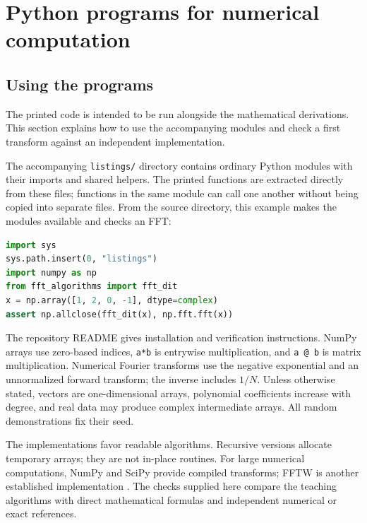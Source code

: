 \chapter{Python programs for numerical computation}
\label{appendix-python-numerical}

\section*{Using the programs}

The printed code is intended to be run alongside the mathematical
derivations. This section explains how to use the accompanying modules and
check a first transform against an independent implementation.

The accompanying \texttt{listings/} directory contains ordinary Python
modules with their imports and shared helpers. The printed functions are
extracted directly from these files; functions in the same module can call
one another without being copied into separate files. From the source
directory, this example makes the modules available and checks an FFT:
\begin{lstlisting}[language=Python]
import sys
sys.path.insert(0, "listings")
import numpy as np
from fft_algorithms import fft_dit
x = np.array([1, 2, 0, -1], dtype=complex)
assert np.allclose(fft_dit(x), np.fft.fft(x))
\end{lstlisting}
The repository README gives installation and verification instructions.
NumPy arrays use zero-based indices, \texttt{a*b} is entrywise multiplication,
and \texttt{a @ b} is matrix multiplication. Numerical Fourier transforms
use the negative exponential and an unnormalized forward transform; the
inverse includes $1/N$. Unless otherwise stated, vectors are one-dimensional
arrays, polynomial coefficients increase with degree, and real data may
produce complex intermediate arrays. All random demonstrations fix their seed.

The implementations favor readable algorithms. Recursive versions allocate
temporary arrays; they are not in-place routines. For large numerical
computations, NumPy and SciPy provide compiled transforms; FFTW is another
established implementation \cite{fftw-software}. The checks supplied here
compare the teaching algorithms with direct mathematical formulas and
independent numerical or exact references.

